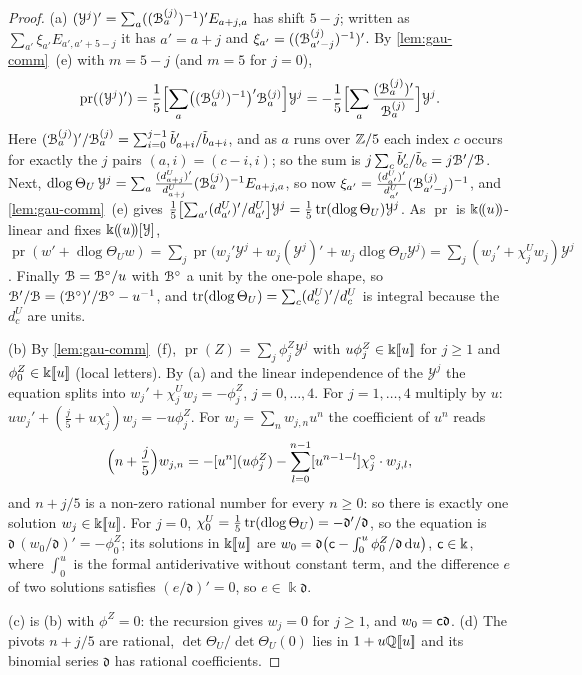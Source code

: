 \begin{proof}
(a) $(\mathcal Y^j)'=\sum_a((\mathcal{B}^{(j)}_a)^{-1})'E_{a+j,a}$ has shift $5-j$; written as $\sum_{a'}\xi_{a'}E_{a',a'+5-j}$ it has $a'=a+j$ and $\xi_{a'}=((\mathcal{B}^{(j)}_{a'-j})^{-1})'$. By \cref{lem:gau-comm}~(e) with $m=5-j$ (and $m=5$ for $j=0$),
\[
\operatorname{pr}((\mathcal Y^j)')=\frac15\Bigl[\sum_a\bigl((\mathcal{B}^{(j)}_a)^{-1}\bigr)'\mathcal{B}^{(j)}_a\Bigr]\mathcal Y^j=-\frac15\Bigl[\sum_a\frac{(\mathcal{B}^{(j)}_a)'}{\mathcal{B}^{(j)}_a}\Bigr]\mathcal Y^j .
\]
Here $(\mathcal{B}^{(j)}_a)'/\mathcal{B}^{(j)}_a=\sum_{i=0}^{j-1}\tilde b_{a+i}'/\tilde b_{a+i}$, and as $a$ runs over $\mathbb{Z}/5$ each index $c$ occurs for exactly the $j$ pairs $(a,i)=(c-i,i)$; so the sum is $j\sum_c\tilde b_c'/\tilde b_c=j\mathcal{B}'/\mathcal{B}$. Next, $\operatorname{dlog}\Theta_U\,\mathcal Y^j=\sum_a\frac{(d^U_{a+j})'}{d^U_{a+j}}(\mathcal{B}^{(j)}_a)^{-1}E_{a+j,a}$, so now $\xi_{a'}=\frac{(d^U_{a'})'}{d^U_{a'}}(\mathcal{B}^{(j)}_{a'-j})^{-1}$, and \cref{lem:gau-comm}~(e) gives $\frac15\bigl[\sum_{a'}(d^U_{a'})'/d^U_{a'}\bigr]\mathcal Y^j=\frac15\operatorname{tr}(\operatorname{dlog}\Theta_U)\mathcal Y^j$. As $\operatorname{pr}$ is $\Bbbk(\!(u)\!)$-linear and fixes $\Bbbk(\!(u)\!)[\mathcal Y]$, $\operatorname{pr}(w'+\operatorname{dlog}\Theta_Uw)=\sum_j\operatorname{pr}\bigl(w_j'\mathcal Y^j+w_j(\mathcal Y^j)'+w_j\operatorname{dlog}\Theta_U\mathcal Y^j\bigr)=\sum_j(w_j'+\chi^U_jw_j)\mathcal Y^j$. Finally $\mathcal{B}=\mathcal{B}^\circ/u$ with $\mathcal{B}^\circ$ a unit by the one-pole shape, so $\mathcal{B}'/\mathcal{B}=(\mathcal{B}^\circ)'/\mathcal{B}^\circ-u^{-1}$, and $\operatorname{tr}(\operatorname{dlog}\Theta_U)=\sum_c(d^U_c)'/d^U_c$ is integral because the $d^U_c$ are units.

(b) By \cref{lem:gau-comm}~(f), $\operatorname{pr}(Z)=\sum_j\phi^Z_j\mathcal Y^j$ with $u\phi^Z_j\in\Bbbk[\![ u ]\!]$ for $j\geq1$ and $\phi^Z_0\in\Bbbk[\![ u ]\!]$ (local letters). By (a) and the linear independence of the $\mathcal Y^j$ the equation splits into $w_j'+\chi^U_jw_j=-\phi^Z_j$, $j=0,\dots,4$. For $j=1,\dots,4$ multiply by $u$: $uw_j'+(\frac j5+u\chi^\circ_j)w_j=-u\phi^Z_j$. For $w_j=\sum_nw_{j,n}u^n$ the coefficient of $u^n$ reads
\[
\Bigl(n+\frac j5\Bigr)w_{j,n}=-[u^n](u\phi^Z_j)-\sum_{l=0}^{n-1}[u^{n-1-l}]\chi^\circ_j\cdot w_{j,l},
\]
and $n+j/5$ is a non-zero rational number for every $n\geq0$: so there is exactly one solution $w_j\in\Bbbk[\![ u ]\!]$. For $j=0$, $\chi^U_0=\frac15\operatorname{tr}(\operatorname{dlog}\Theta_U)=-\mathfrak d'/\mathfrak d$, so the equation is $\mathfrak d\,(w_0/\mathfrak d)'=-\phi^Z_0$; its solutions in $\Bbbk[\![ u ]\!]$ are $w_0=\mathfrak d\bigl(\mathsf{c}-\int_0^u\phi^Z_0/\mathfrak d\,\mathrm{d} u\bigr)$, $\mathsf{c}\in\Bbbk$, where $\int_0^u$ is the formal antiderivative without constant term, and the difference $e$ of two solutions satisfies $(e/\mathfrak d)'=0$, so $e\in\Bbbk\mathfrak d$.

(c) is (b) with $\phi^Z=0$: the recursion gives $w_j=0$ for $j\geq1$, and $w_0=\mathsf{c}\mathfrak d$. (d) The pivots $n+j/5$ are rational, $\det\Theta_U/\det\Theta_U(0)$ lies in $1+u\mathbb{Q}[\![ u ]\!]$ and its binomial series $\mathfrak d$ has rational coefficients.
\end{proof}

